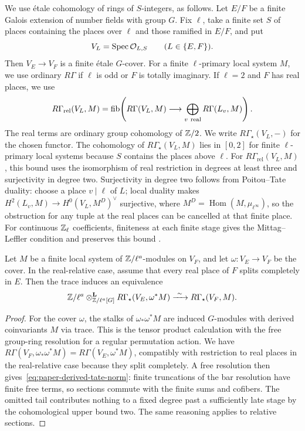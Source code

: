 We use \'etale cohomology of rings of $S$-integers, as follows.
Let $E/F$ be a finite Galois extension of number fields with group $G$.
Fix $\ell$, take a finite set $S$ of places containing the places over $\ell$ and those ramified in $E/F$, and put
\[
 V_L=\operatorname{Spec}\mathcal O_{L,S}\qquad(L\in\{E,F\}).
\]
Then $V_E\to V_F$ is a finite \'etale $G$-cover.
For a finite $\ell$-primary local system $M$, we use ordinary $R\Gamma$ if $\ell$ is odd or $F$ is totally imaginary.
If $\ell=2$ and $F$ has real places, we use
\[
 R\Gamma_{\mathrm{rel}}(V_L,M)=
 \fib\!\left(R\Gamma(V_L,M)\longrightarrow
              \bigoplus_{v\ \mathrm{real}}R\Gamma(L_v,M)\right).
\]
The real terms are ordinary group cohomology of $\mathbb Z/2$.
We write $R\Gamma_\star(V_L,-)$ for the chosen functor.
The cohomology of $R\Gamma_\star(V_L,M)$ lies in $[0,2]$ for finite $\ell$-primary local systems because $S$ contains the places above $\ell$.
For $R\Gamma_{\mathrm{rel}}(V_L,M)$, this bound uses the isomorphism of real restriction in degrees at least three and surjectivity in degree two.
Surjectivity in degree two follows from Poitou--Tate duality: choose a place $v\mid\ell$ of $L$; local duality makes $H^2(L_v,M)\to H^0(V_L,M^D)^\vee$ surjective, where $M^D=\operatorname{Hom}(M,\mu_{\ell^\infty})$, so the obstruction for any tuple at the real places can be cancelled at that finite place.
For continuous $\mathbb Z_\ell$ coefficients, finiteness at each finite stage gives the Mittag--Leffler condition and preserves this bound \cite{KahnPositive,ChinburgEtal}.

\begin{lemma}\label{lem:paper-derived-tate-norm}
Let $M$ be a finite local system of $\mathbb Z/\ell^a$-modules on $V_F$, and let $\omega\colon V_E\to V_F$ be the cover.
In the real-relative case, assume that every real place of $F$ splits completely in $E$.
Then the trace induces an equivalence
\begin{equation}\label{eq:paper-derived-tate-norm}
  \mathbb Z/\ell^a\otimes_{\mathbb Z/\ell^a[G]}^{\mathbf L} R\Gamma_\star(V_E,\omega^*M)
      \xrightarrow{\ \sim\ } R\Gamma_\star(V_F,M).
\end{equation}
\end{lemma}
\begin{proof}
For the cover $\omega$, the stalks of $\omega_*\omega^*M$ are induced $G$-modules with derived coinvariants $M$ via trace.
This is the tensor product calculation with the free group-ring resolution for a regular permutation action.
We have $R\Gamma(V_F,\omega_*\omega^*M)=R\Gamma(V_E,\omega^*M)$, compatibly with restriction to real places in the real-relative case because they split completely.
A free resolution then gives~\eqref{eq:paper-derived-tate-norm}: finite truncations of the bar resolution have finite free terms, so sections commute with the finite sums and cofibers.
The omitted tail contributes nothing to a fixed degree past a sufficiently late stage by the cohomological upper bound two.
The same reasoning applies to relative sections.
\end{proof}

